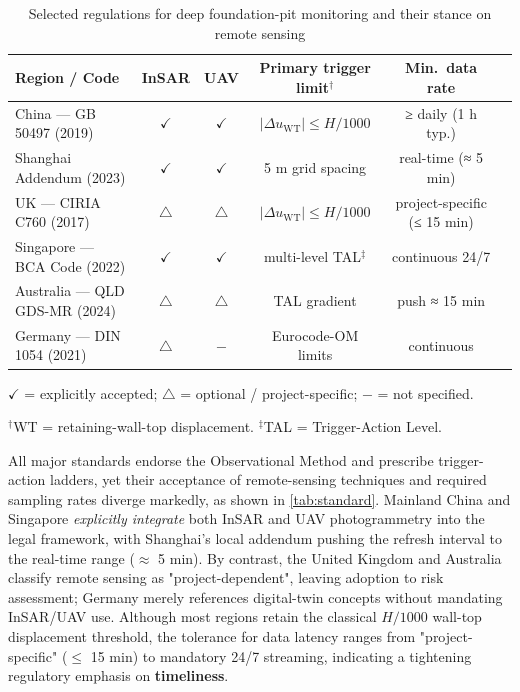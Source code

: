 \documentclass[preprint,11pt,authoryear,3p]{elsarticle}
\newcommand{\cmark}{\(\checkmark\)} %
\newcommand{\tmark}{\(\triangle\)}   %
\newcommand{\nmark}{\(-\)}           %
\begin{document}
\begin{table}[htbp]
\centering
\caption{Selected regulations for deep foundation-pit monitoring and their stance on remote sensing}
\label{tab:standard}
\begin{threeparttable}
\begin{tabular}{p{5cm}ccccc}
\toprule
\textbf{Region / Code}         & \textbf{InSAR} & \textbf{UAV} & \textbf{Primary trigger limit$^\dagger$} & \textbf{Min.\ data rate}\\
\midrule
China — GB 50497 (2019)        & \cmark & \cmark & $|\Delta u_{\text{WT}}|\!\le\!H/1000$ & ≥ daily (1 h typ.) \\
Shanghai Addendum (2023)       & \cmark & \cmark & 5 m grid spacing                     & real-time (≈ 5 min)\\
UK — CIRIA C760 (2017)         & \tmark & \tmark & $|\Delta u_{\text{WT}}|\!\le\!H/1000$ & project-specific (≤ 15 min)\\
Singapore — BCA Code (2022)    & \cmark & \cmark & multi-level TAL$^\ddagger$            & continuous 24/7\\
Australia — QLD GDS-MR (2024)  & \tmark & \tmark & TAL gradient                         & push ≈ 15 min\\
Germany — DIN 1054 (2021)      & \tmark & \nmark & Eurocode-OM limits                   & continuous\\
\bottomrule
\end{tabular}
\begin{tablenotes}\footnotesize
\item \cmark{} = explicitly accepted;\; \tmark{} = optional / project-specific;\; \nmark{} = not specified.%
\item $^\dagger$WT = retaining-wall-top displacement.\; $^\ddagger$TAL = Trigger-Action Level.
\end{tablenotes}
\end{threeparttable}
\end{table}

All major standards endorse the Observational Method and prescribe trigger-action ladders, yet their acceptance of remote-sensing techniques and required sampling rates diverge markedly, as shown in \autoref{tab:standard}. Mainland China and Singapore \emph{explicitly integrate} both InSAR and UAV photogrammetry into the legal framework, with Shanghai's local addendum pushing the refresh interval to the real-time range ($\approx$ 5 min). By contrast, the United Kingdom and Australia classify remote sensing as "project-dependent", leaving adoption to risk assessment; Germany merely references digital-twin concepts without mandating InSAR/UAV use. Although most regions retain the classical $H/1000$ wall-top displacement threshold, the tolerance for data latency ranges from "project-specific" ($\le$ 15 min) to mandatory 24/7 streaming, indicating a tightening regulatory emphasis on \textbf{timeliness}.
\end{document}
